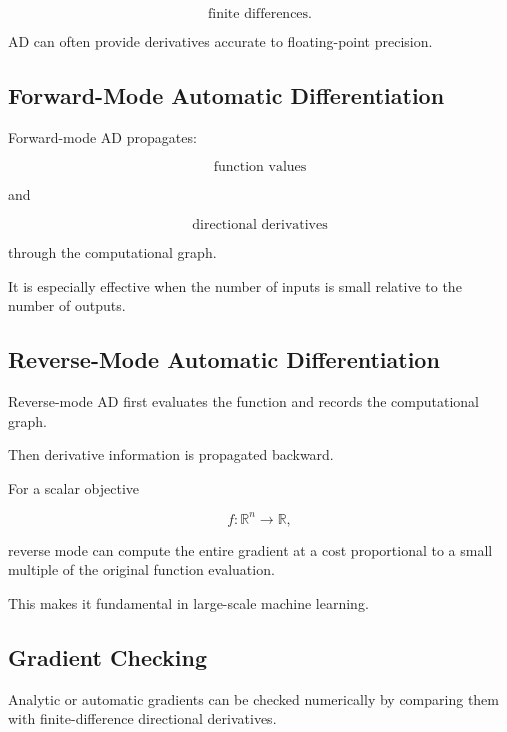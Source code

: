 \[
\boxed{
\text{finite differences}.
}
\]

AD can often provide derivatives accurate to floating-point precision.

\subsection{Forward-Mode Automatic Differentiation}
\label{subsec:forward-mode-ad}

Forward-mode AD propagates:

\[
\boxed{
\text{function values}
}
\]

and

\[
\boxed{
\text{directional derivatives}
}
\]

through the computational graph.

It is especially effective when the number of inputs is small relative to
the number of outputs.

\subsection{Reverse-Mode Automatic Differentiation}
\label{subsec:reverse-mode-ad}

Reverse-mode AD first evaluates the function and records the computational
graph.

Then derivative information is propagated backward.

For a scalar objective

\[
f:\mathbb{R}^n\to\mathbb{R},
\]

reverse mode can compute the entire gradient at a cost proportional to a
small multiple of the original function evaluation.

This makes it fundamental in large-scale machine learning.

\subsection{Gradient Checking}
\label{subsec:gradient-checking}

Analytic or automatic gradients can be checked numerically by comparing
them with finite-difference directional derivatives.

